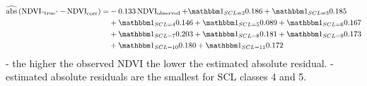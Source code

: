 \begin{equation}\label{eq:corr_lm_res}
	\begin{aligned}		
		\widehat{\operatorname{abs}}\left({\operatorname{NDVI}_\text{``true''} - \operatorname{NDVI}}_{\text{corr}}\right)  = &
		-0.133 \operatorname{NDVI}_\text{observed}  
		+ \mathbbm 1_{{SCL = 2}} 0.186 
		+ \mathbbm 1_{{SCL = 3}} 0.185 \\ &
		+ \mathbbm 1_{{SCL = 4}} 0.146 
		+ \mathbbm 1_{{SCL = 5}} 0.089 
		+ \mathbbm 1_{{SCL = 6}} 0.167 \\ &
		+ \mathbbm 1_{{SCL = 7}} 0.203 
		+ \mathbbm 1_{{SCL = 8}} 0.181  
		+ \mathbbm 1_{{SCL = 9}} 0.173 \\ &
		+ \mathbbm 1_{{SCL = 10}} 0.180 
		+ \mathbbm 1_{{SCL = 11}} 0.172 
	\end{aligned}
\end{equation}
- the higher the observed NDVI the lower the estimated absolute residual.
- estimated absolute residuals are the smallest for SCL classes 4 and 5.  
